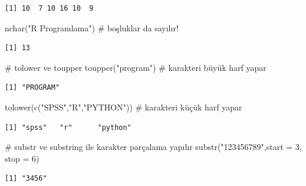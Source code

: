 \documentclass[
  letterpaper,
  DIV=11,
  numbers=noendperiod]{scrreprt}
\newenvironment{Shaded}{\begin{snugshade}}{\end{snugshade}}
\newcommand{\AttributeTok}[1]{\textcolor[rgb]{0.40,0.45,0.13}{#1}}
\newcommand{\CommentTok}[1]{\textcolor[rgb]{0.37,0.37,0.37}{#1}}
\newcommand{\DecValTok}[1]{\textcolor[rgb]{0.68,0.00,0.00}{#1}}
\newcommand{\FunctionTok}[1]{\textcolor[rgb]{0.28,0.35,0.67}{#1}}
\newcommand{\NormalTok}[1]{\textcolor[rgb]{0.00,0.23,0.31}{#1}}
\newcommand{\StringTok}[1]{\textcolor[rgb]{0.13,0.47,0.30}{#1}}
\begin{document}
\begin{verbatim}
[1] 10  7 10 16 10  9
\end{verbatim}

\begin{Shaded}
\begin{Highlighting}[]
\FunctionTok{nchar}\NormalTok{(}\StringTok{"R Programlama"}\NormalTok{) }\CommentTok{\# boşluklar da sayılır!}
\end{Highlighting}
\end{Shaded}

\begin{verbatim}
[1] 13
\end{verbatim}

\begin{Shaded}
\begin{Highlighting}[]
\CommentTok{\# tolower ve toupper }
\FunctionTok{toupper}\NormalTok{(}\StringTok{"program"}\NormalTok{) }\CommentTok{\# karakteri büyük harf yapar}
\end{Highlighting}
\end{Shaded}

\begin{verbatim}
[1] "PROGRAM"
\end{verbatim}

\begin{Shaded}
\begin{Highlighting}[]
\FunctionTok{tolower}\NormalTok{(}\FunctionTok{c}\NormalTok{(}\StringTok{"SPSS"}\NormalTok{,}\StringTok{"R"}\NormalTok{,}\StringTok{"PYTHON"}\NormalTok{)) }\CommentTok{\# karakteri küçük harf yapar}
\end{Highlighting}
\end{Shaded}

\begin{verbatim}
[1] "spss"   "r"      "python"
\end{verbatim}

\begin{Shaded}
\begin{Highlighting}[]
\CommentTok{\# substr ve substring ile karakter parçalama yapılır}
\FunctionTok{substr}\NormalTok{(}\StringTok{"123456789"}\NormalTok{,}\AttributeTok{start =} \DecValTok{3}\NormalTok{, }\AttributeTok{stop =} \DecValTok{6}\NormalTok{)}
\end{Highlighting}
\end{Shaded}

\begin{verbatim}
[1] "3456"
\end{verbatim}
\end{document}
